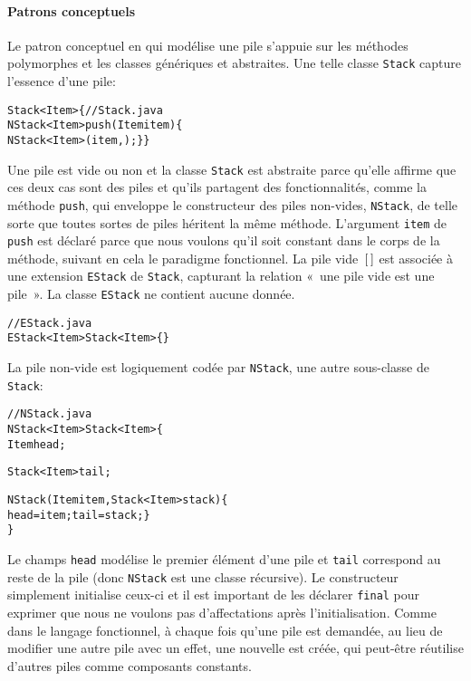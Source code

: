 \paragraph{Patrons conceptuels}

Le patron conceptuel en \Java qui modélise une pile s'appuie sur les méthodes polymorphes et les classes
génériques et abstraites. Une telle classe \texttt{Stack} capture
l'essence d'une pile:
\begin{alltt}
\public \abstractX \class Stack<Item> \{ // Stack.java
  \public \final NStack<Item> push(\final Item item) \{
    \return \new NStack<Item>(item,\this); \} \}
\end{alltt}
Une pile est vide ou non et la classe \texttt{Stack} est abstraite
parce qu'elle affirme que ces deux cas sont des piles et qu'ils
partagent des fonctionnalités, comme la méthode \texttt{push}, qui
enveloppe le constructeur des piles non-vides, \texttt{NStack}, de
telle sorte que toutes sortes de piles héritent la même
méthode. L'argument \texttt{item} de \texttt{push} est déclaré
\final{} parce que nous voulons qu'il soit constant dans le corps de
la méthode, suivant en cela le paradigme fonctionnel. La pile
vide~\([\,]\) est associée à une extension \texttt{EStack} de
\texttt{Stack}, capturant la relation «~une pile vide est une
pile~». La classe \texttt{EStack} ne contient aucune donnée.
\begin{alltt}
// EStack.java
\public \final \class EStack<Item> \extends Stack<Item> \{\}
\end{alltt}
La pile non-vide est logiquement codée par \texttt{NStack}, une autre
sous-classe de \texttt{Stack}:
\begin{alltt}
// NStack.java
\public \final \class NStack<Item> \extends Stack<Item> \{
  \private \final Item head;

  \private \final Stack<Item> tail;

  \public NStack(\final Item item, \final Stack<Item> stack) \{
    head = item; tail = stack; \}
\}
\end{alltt}
Le champs \texttt{head} modélise le premier élément d'une pile et
\texttt{tail} correspond au reste de la pile (donc \texttt{NStack} est
une classe récursive). Le constructeur simplement initialise ceux-ci
et il est important de les déclarer \texttt{final} pour exprimer que
nous ne voulons pas d'affectations après l'initialisation. Comme dans
le langage fonctionnel, à chaque fois qu'une pile est demandée, au
lieu de modifier une autre pile avec un effet, une nouvelle est créée,
qui peut-être réutilise d'autres piles comme composants constants.

